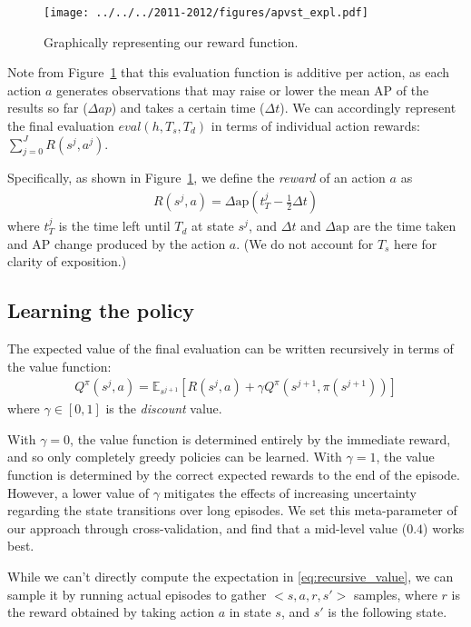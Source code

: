 \begin{figure}[h!]
\centering
\texttt{[image: ../../../2011-2012/figures/apvst\_expl.pdf]}
\caption{
Graphically representing our reward function.
}\label{fig:rewards}
\end{figure}

Note from Figure~\ref{fig:rewards} that this evaluation function is additive per action, as each action $a$ generates observations that may raise or lower the mean AP of the results so far ($\Delta ap$) and takes a certain time ($\Delta t$).
We can accordingly represent the final evaluation $eval(h,T_s,T_d)$ in terms of individual action rewards: $\sum_{j=0}^J R(s^j,a^j)$.

Specifically, as shown in Figure~\ref{fig:rewards}, we define the \emph{reward} of an action $a$ as
\begin{align}\label{eq:advanced}
R(s^j,a) = \Delta \text{ap} (t_T^j-\frac{1}{2}\Delta t)
\end{align}
where $t_T^j$ is the time left until $T_d$ at state $s^j$, and $\Delta t$ and $\Delta \text{ap}$ are the time taken and AP change produced by the action $a$.
(We do not account for $T_s$ here for clarity of exposition.)

\subsection{Learning the policy}
The expected value of the final evaluation can be written recursively in terms of the value function:
\begin{align} \label{eq:recursive_value}
Q^\pi(s^j,a) = \mathbb{E}_{s^{j+1}} [R(s^j,a) + \gamma Q^\pi(s^{j+1},\pi(s^{j+1}))]
\end{align}
where $\gamma \in [0,1]$ is the \emph{discount} value.

With $\gamma=0$, the value function is determined entirely by the immediate reward, and so only completely greedy policies can be learned.
With $\gamma=1$, the value function is determined by the correct expected rewards to the end of the episode.
However, a lower value of $\gamma$ mitigates the effects of increasing uncertainty regarding the state transitions over long episodes. %
We set this meta-parameter of our approach through cross-validation, and find that a mid-level value ($0.4$) works best.

While we can't directly compute the expectation in \eqref{eq:recursive_value}, we can sample it by running actual episodes to gather $<s,a,r,s'>$ samples, where $r$ is the reward obtained by taking action $a$ in state $s$, and $s'$ is the following state.

